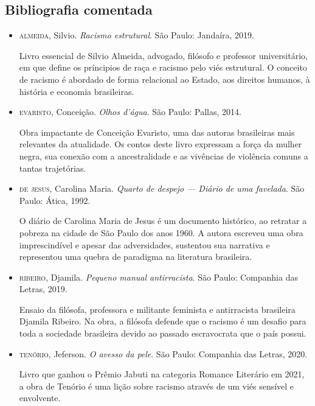 \documentclass[11pt]{extarticle}
\begin{document}
\subsection{Bibliografia comentada}

\begin{itemize}

\item \textsc{almeida}, Silvio. \textit{Racismo estrutural}. São Paulo: Jandaíra, 2019.

Livro essencial de Silvio Almeida, advogado, filósofo e professor universitário, em que define os príncipios de raça e racismo pelo viés estrutural. O conceito de racismo é abordado de forma relacional ao Estado, aos direitos humanos, à história e economia brasileiras.

\item \textsc{evaristo}, Conceição. \textit{Olhos d'água}. São Paulo: Pallas, 2014.

Obra impactante de Conceição Evaristo, uma das autoras brasileiras mais relevantes da atualidade. Os contos deste livro expressam a força da mulher negra, sua conexão com a ancestralidade e as vivências de violência comuns a tantas trajetórias.

\item \textsc{de jesus}, Carolina Maria. \textit{Quarto de despejo — Diário de uma favelada}. São Paulo: Ática, 1992.

O diário de Carolina Maria de Jesus é um documento histórico, ao retratar a pobreza na cidade de São Paulo dos anos 1960. A autora escreveu uma obra imprescindível e apesar das adversidades, sustentou sua narrativa e representou uma quebra de paradigma na literatura brasileira.

\item \textsc{ribeiro}, Djamila. \textit{Pequeno manual antirracista}. São Paulo: Companhia das Letras, 2019. 

Ensaio da filósofa, professora e militante feminista e antirracista brasileira Djamila Ribeiro. Na obra, a filósofa defende que o racismo é um desafio para toda a sociedade brasileira devido ao passado escravocrata que o país possui. 

\item \textsc{tenório}, Jeferson. \textit{O avesso da pele}. São Paulo: Companhia das Letras, 2020.

Livro que ganhou o Prêmio Jabuti na categoria Romance Literário em 2021, a obra de Tenório é uma lição sobre racismo através de um viés sensível e envolvente. 

\end{itemize}
\end{document}
